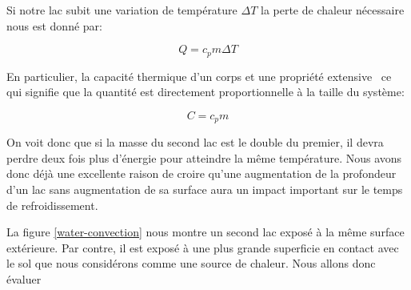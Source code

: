 \documentclass[12pt]{article}
\begin{document}
Si notre lac subit une variation de temp\'erature $\Delta T$ la perte de chaleur n\'ecessaire nous
est donn\'e par:

\[ Q = c_pm\Delta T \]

En particulier, la capacit\'e thermique d'un corps et une propri\'et\'e extensive~\cite{Extensive}
ce qui signifie que la quantit\'e est directement proportionnelle \`a la taille du syst\`eme:

\[ C = c_pm \]

On voit donc que si la masse du second lac est le double du premier, il devra perdre deux fois plus
d'\'energie pour atteindre la m\^eme temp\'erature. Nous avons donc d\'ej\`a une excellente raison
de croire qu'une augmentation de la profondeur d'un lac sans augmentation de sa surface aura un
impact important sur le temps de refroidissement.

La figure \ref{water-convection} nous montre un second lac expos\'e \`a la m\^eme surface
ext\'erieure. Par contre, il est expos\'e \`a une plus grande superficie en contact avec le sol que
nous consid\'erons comme une source de chaleur. Nous allons donc \'evaluer
\end{document}

